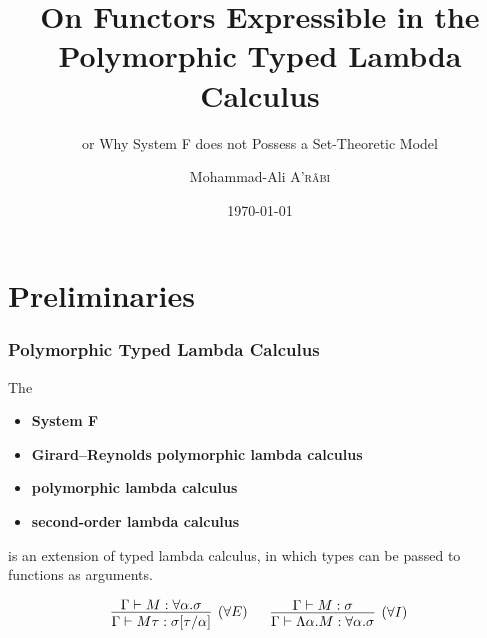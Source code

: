 \documentclass[10pt, compress]{beamer}
\title{On Functors Expressible in the Polymorphic Typed Lambda Calculus}
\subtitle{or Why System F does not Possess a Set-Theoretic Model}
\date{\today}
\author{Mohammad-Ali \textsc{A'r\^abi}}
\institute{Albert-Ludwigs-Universit\"at Freiburg}
\begin{document}
\maketitle

\section{Preliminaries}

\begin{frame}[fragile]
    \frametitle{Polymorphic Typed Lambda Calculus}
  
    The
    \begin{itemize}
        \item \textbf{System F}
        \item \textbf{Girard--Reynolds polymorphic lambda calculus}
        \item \textbf{polymorphic lambda calculus}
        \item \textbf{second-order lambda calculus}
    \end{itemize}
    is an extension of typed lambda calculus, in which types can be passed to functions as arguments.
  
    $$
    \begin{matrix}
    \infer[(\forall{}E)]{\Gamma \vdash M\tau : \sigma[\tau/\alpha]}{\Gamma \vdash M : \forall\alpha.\sigma}
    \ &\ 
    \infer[(\forall{}I)]{\Gamma \vdash \Lambda\alpha. M : \forall\alpha.\sigma}{\Gamma \vdash M : \sigma}
    \end{matrix}
    $$
\end{frame}

\end{document}
